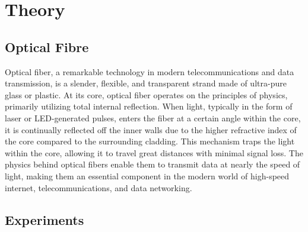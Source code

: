 \cleardoublepage%
\chapter{\label{chap:intro}Theory}%


\section{\label{sec:intro_swm_africa}Optical Fibre}%
Optical fiber, a remarkable technology in modern telecommunications and data transmission, is a slender, flexible, and transparent strand made of ultra-pure glass or plastic. At its core, optical fiber operates on the principles of physics, primarily utilizing total internal reflection. When light, typically in the form of laser or LED-generated pulses, enters the fiber at a certain angle within the core, it is continually reflected off the inner walls due to the higher refractive index of the core compared to the surrounding cladding. This mechanism traps the light within the core, allowing it to travel great distances with minimal signal loss. The physics behind optical fibers enable them to transmit data at nearly the speed of light, making them an essential component in the modern world of high-speed internet, telecommunications, and data networking.

\section{\label{sec:intro_res_quest}Experiments}


